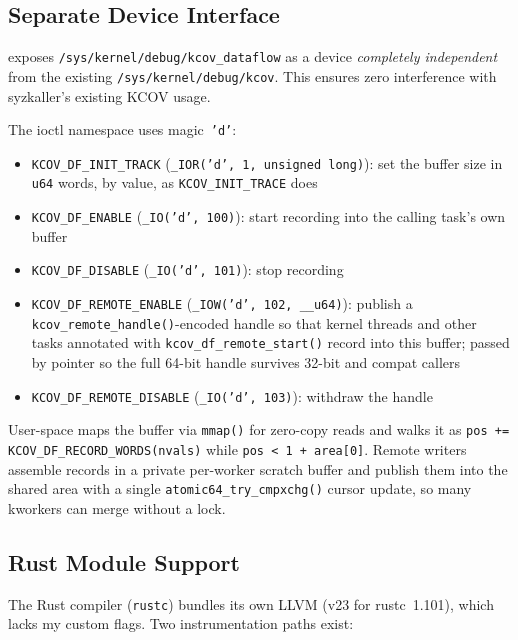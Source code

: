 \documentclass{article}
\begin{document}
\subsection{Separate Device Interface}\label{sec:device}

\toolname{} exposes \texttt{/sys/kernel/debug/kcov\_dataflow} as a device
\emph{completely independent} from the existing \texttt{/sys/kernel/debug/kcov}.
This ensures zero interference with syzkaller's existing KCOV usage.

The ioctl namespace uses magic~\texttt{'d'}:
\begin{itemize}[nosep]
  \item \texttt{KCOV\_DF\_INIT\_TRACK} (\texttt{\_IOR('d', 1, unsigned long)}):
        set the buffer size in \texttt{u64} words, by value, as
        \texttt{KCOV\_INIT\_TRACE} does
  \item \texttt{KCOV\_DF\_ENABLE} (\texttt{\_IO('d', 100)}): start recording
        into the calling task's own buffer
  \item \texttt{KCOV\_DF\_DISABLE} (\texttt{\_IO('d', 101)}): stop recording
  \item \texttt{KCOV\_DF\_REMOTE\_ENABLE} (\texttt{\_IOW('d', 102, \_\_u64)}):
        publish a \texttt{kcov\_remote\_handle()}-encoded handle so that kernel
        threads and other tasks annotated with
        \texttt{kcov\_df\_remote\_start()} record into this buffer; passed by
        pointer so the full 64-bit handle survives 32-bit and compat callers
  \item \texttt{KCOV\_DF\_REMOTE\_DISABLE} (\texttt{\_IO('d', 103)}): withdraw
        the handle
\end{itemize}
User-space maps the buffer via \texttt{mmap()} for zero-copy reads and walks it
as \texttt{pos += KCOV\_DF\_RECORD\_WORDS(nvals)} while
\texttt{pos < 1 + area[0]}. Remote writers assemble records in a private
per-worker scratch buffer and publish them into the shared area with a single
\texttt{atomic64\_try\_cmpxchg()} cursor update, so many kworkers can merge
without a lock.

\subsection{Rust Module Support}\label{sec:rust}

The Rust compiler (\texttt{rustc}) bundles its own LLVM (v23 for
rustc~1.101), which lacks my custom flags. Two instrumentation paths exist:
\end{document}
